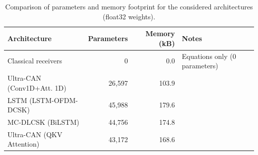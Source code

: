 \begin{table}[t]
\centering
\caption{Comparison of parameters and memory footprint for the considered architectures (float32 weights).}
\label{tab:weight_comparison}
\begin{tabular}{l r r l}
\toprule
\textbf{Architecture} & \textbf{Parameters} & \textbf{Memory (kB)} & \textbf{Notes} \\
\midrule
Classical receivers & 0 & 0.0 & Equations only (0 parameters) \\
Ultra-CAN (Conv1D+Att. 1D) & 26,597 & 103.9 &  \\
LSTM (LSTM-OFDM-DCSK) & 45,988 & 179.6 &  \\
MC-DLCSK (BiLSTM) & 44,756 & 174.8 &  \\
Ultra-CAN (QKV Attention) & 43,172 & 168.6 &  \\
\bottomrule
\end{tabular}
\end{table}